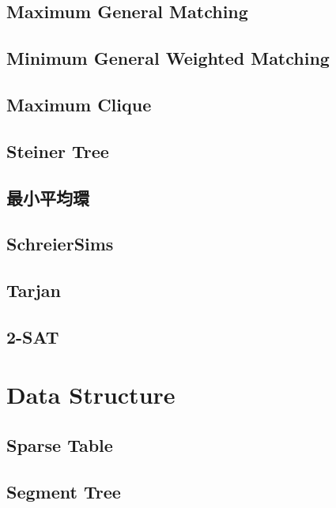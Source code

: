 \subsection{Maximum General Matching}

\subsection{Minimum General Weighted Matching}

\subsection{Maximum Clique}

\subsection{Steiner Tree}

\subsection{最小平均環}

\subsection{SchreierSims}

\subsection{Tarjan}

\subsection{2-SAT}



\section{Data Structure}

\subsection{Sparse Table}

\subsection{Segment Tree}




